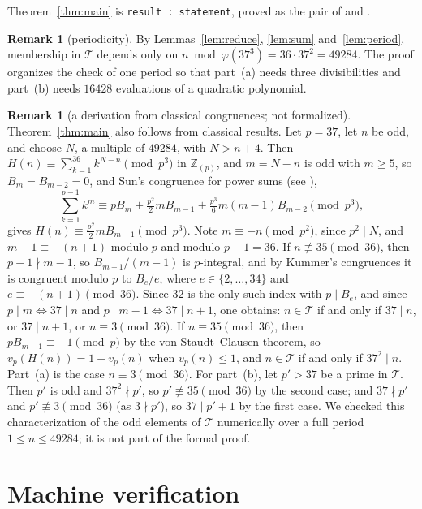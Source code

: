 \documentclass[11pt]{amsart}
\theoremstyle{plain}
\theoremstyle{definition}
\newtheorem{remark}[theorem]{Remark}
\newcommand{\code}[1]{\texttt{#1}}
\newcommand{\Z}{\mathbb{Z}}
\newcommand{\Term}{\mathcal{T}}
\begin{document}
Theorem~\ref{thm:main} is \code{result : statement}, proved as the pair of  and .

\begin{remark}[periodicity]
By Lemmas~\ref{lem:reduce}, \ref{lem:sum} and~\ref{lem:period}, membership in $\Term$ depends only on $n\bmod \varphi(37^3)=36\cdot37^2=49284$. The proof organizes the check of one period so that part~(a) needs three divisibilities and part~(b) needs $16428$ evaluations of a quadratic polynomial.
\end{remark}

\begin{remark}[a derivation from classical congruences; not formalized]\label{rem:classical}
Theorem~\ref{thm:main} also follows from classical results. Let $p=37$, let $n$ be odd, and choose $N$, a multiple of $49284$, with $N>n+4$. Then $H(n)\equiv\sum_{k=1}^{36}k^{N-n}\pmod{p^3}$ in $\Z_{(p)}$, and $m=N-n$ is odd with $m\ge5$, so $B_m=B_{m-2}=0$, and Sun's congruence for power sums \cite{Su} (see \cite[Result~2]{Le}),
\[
  \sum_{k=1}^{p-1}k^m\equiv pB_m+\tfrac{p^2}{2}mB_{m-1}+\tfrac{p^3}{6}m(m-1)B_{m-2}\pmod{p^3},
\]
gives $H(n)\equiv\tfrac{p^2}{2}mB_{m-1}\pmod{p^3}$. Note $m\equiv-n\pmod{p^2}$, since $p^2\mid N$, and $m-1\equiv-(n+1)$ modulo $p$ and modulo $p-1=36$.
If $n\not\equiv35\pmod{36}$, then $p-1\nmid m-1$, so $B_{m-1}/(m-1)$ is $p$-integral, and by Kummer's congruences it is congruent modulo $p$ to $B_e/e$, where $e\in\{2,\dots,34\}$ and $e\equiv-(n+1)\pmod{36}$. Since $32$ is the only such index with $p\mid B_e$, and since $p\mid m\iff37\mid n$ and $p\mid m-1\iff37\mid n+1$, one obtains: $n\in\Term$ if and only if $37\mid n$, or $37\mid n+1$, or $n\equiv3\pmod{36}$.
If $n\equiv35\pmod{36}$, then $pB_{m-1}\equiv-1\pmod p$ by the von Staudt--Clausen theorem, so $v_p(H(n))=1+v_p(n)$ when $v_p(n)\le1$, and $n\in\Term$ if and only if $37^2\mid n$.
Part~(a) is the case $n\equiv3\pmod{36}$. For part~(b), let $p'>37$ be a prime in $\Term$. Then $p'$ is odd and $37^2\nmid p'$, so $p'\not\equiv35\pmod{36}$ by the second case; and $37\nmid p'$ and $p'\not\equiv3\pmod{36}$ (as $3\nmid p'$), so $37\mid p'+1$ by the first case. We checked this characterization of the odd elements of $\Term$ numerically over a full period $1\le n\le49284$; it is not part of the formal proof.
\end{remark}

\section{Machine verification}\label{sec:lean}
\end{document}
